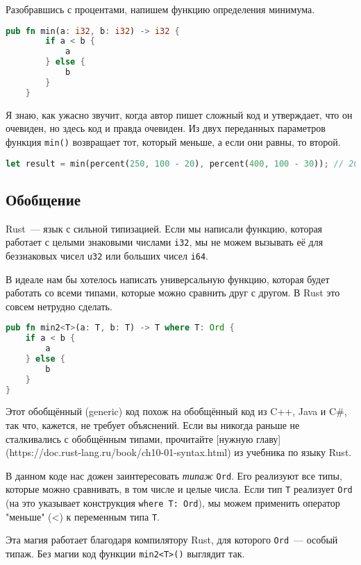 Разобравшись с процентами, напишем функцию определения минимума.

\begin{lstlisting}[language=Rust]
    pub fn min(a: i32, b: i32) -> i32 {
        if a < b {
            a
        } else {
            b
        }
    }
\end{lstlisting}

Я знаю, как ужасно звучит, когда автор пишет сложный код и утверждает, что он очевиден, но здесь код и правда очевиден.
Из двух переданных параметров функция \texttt{min()} возвращает тот, который меньше, а если они равны, то второй.

\begin{lstlisting}[language=Rust]
    let result = min(percent(250, 100 - 20), percent(400, 100 - 30)); // 200
\end{lstlisting}

\subsection{Обобщение}

Rust~--- язык с сильной типизацией.
Если мы написали функцию, которая работает с целыми знаковыми числами \texttt{i32}, мы не можем вызывать её для беззнаковых чисел \texttt{u32} или больших чисел \texttt{i64}.

В идеале нам бы хотелось написать универсальную функцию, которая будет работать со всеми типами, которые можно сравнить друг с другом.
В Rust это совсем нетрудно сделать.

\begin{lstlisting}[language=Rust]
    pub fn min2<T>(a: T, b: T) -> T where T: Ord {
    if a < b {
        a
    } else {
        b
    }
}
\end{lstlisting}

Этот обобщённый (generic) код похож на обобщённый код из C++, Java и C\#, так что, кажется, не требует объяснений.
Если вы никогда раньше не сталкивались с обобщённым типами, прочитайте [нужную главу](https://doc.rust-lang.ru/book/ch10-01-syntax.html) из учебника по языку Rust.

В данном коде нас дожен заинтересовать \textit{типаж} \texttt{Ord}.
Его реализуют все типы, которые можно сравнивать, в том числе и целые числа.
Если тип \texttt{T} реализует \texttt{Ord} (на это указывает конструкция \texttt{where T: Ord}), мы можем применить оператор "меньше" (<) к переменным типа \texttt{T}.

Эта магия работает благодаря компилятору Rust, для которого \texttt{Ord}~--- особый типаж. Без магии код функции \texttt{min2<T>()} выглядит так.

